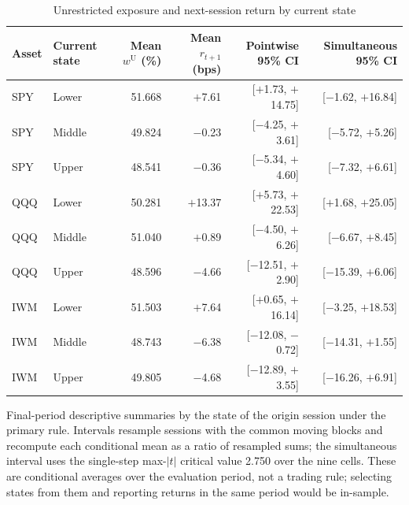 \begin{table}[!htbp]\centering\footnotesize\setlength{\tabcolsep}{5pt}
\caption{Unrestricted exposure and next-session return by current state}\label{tab:statemeans}
\begin{tabular}{llrrrr}\toprule
Asset & Current state & Mean $w^{\mathrm U}$ (\%) & Mean $r_{t+1}$ (bps) & Pointwise 95\% CI & Simultaneous 95\% CI\\\midrule
SPY & Lower & 51.668 & $+$7.61 & [$+$1.73, $+$14.75] & [$-$1.62, $+$16.84]\\
SPY & Middle & 49.824 & $-$0.23 & [$-$4.25, $+$3.61] & [$-$5.72, $+$5.26]\\
SPY & Upper & 48.541 & $-$0.36 & [$-$5.34, $+$4.60] & [$-$7.32, $+$6.61]\\
\midrule
QQQ & Lower & 50.281 & $+$13.37 & [$+$5.73, $+$22.53] & [$+$1.68, $+$25.05]\\
QQQ & Middle & 51.040 & $+$0.89 & [$-$4.50, $+$6.26] & [$-$6.67, $+$8.45]\\
QQQ & Upper & 48.596 & $-$4.66 & [$-$12.51, $+$2.90] & [$-$15.39, $+$6.06]\\
\midrule
IWM & Lower & 51.503 & $+$7.64 & [$+$0.65, $+$16.14] & [$-$3.25, $+$18.53]\\
IWM & Middle & 48.743 & $-$6.38 & [$-$12.08, $-$0.72] & [$-$14.31, $+$1.55]\\
IWM & Upper & 49.805 & $-$4.68 & [$-$12.89, $+$3.55] & [$-$16.26, $+$6.91]\\
\bottomrule\end{tabular}
\par\smallskip\parbox{0.98\linewidth}{\footnotesize Final-period descriptive summaries by the state of the origin session under the primary rule. Intervals resample sessions with the common moving blocks and recompute each conditional mean as a ratio of resampled sums; the simultaneous interval uses the single-step max-$|t|$ critical value 2.750 over the nine cells. These are conditional averages over the evaluation period, not a trading rule; selecting states from them and reporting returns in the same period would be in-sample.}
\end{table}

